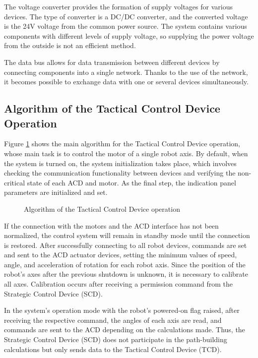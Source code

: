 The voltage converter provides the formation of supply voltages for various devices. The type of converter is a DC/DC converter, and the converted voltage is the 24V voltage from the common power source. The system contains various components with different levels of supply voltage, so supplying the power voltage from the outside is not an efficient method.

The data bus allows for data transmission between different devices by connecting components into a single network. Thanks to the use of the network, it becomes possible to exchange data with one or several devices simultaneously.
\subsection{Algorithm of the Tactical Control Device Operation}

Figure \ref{AlgTCD} shows the main algorithm for the Tactical Control Device operation, whose main task is to control the motor of a single robot axis. By default, when the system is turned on, the system initialization takes place, which involves checking the communication functionality between devices and verifying the non-critical state of each ACD and motor. As the final step, the indication panel parameters are initialized and set.


\begin{figure}[H]
	\centering
	
	\caption{Algorithm of the Tactical Control Device operation}
	\label{AlgTCD}
\end{figure}


If the connection with the motors and the ACD interface has not been normalized, the control system will remain in standby mode until the connection is restored. After successfully connecting to all robot devices, commands are set and sent to the ACD actuator devices, setting the minimum values of speed, angle, and acceleration of rotation for each robot axis. Since the position of the robot's axes after the previous shutdown is unknown, it is necessary to calibrate all axes. Calibration occurs after receiving a permission command from the Strategic Control Device (SCD).

In the system's operation mode with the robot's powered-on flag raised, after receiving the respective command, the angles of each axis are read, and commands are sent to the ACD depending on the calculations made. Thus, the Strategic Control Device (SCD) does not participate in the path-building calculations but only sends data to the Tactical Control Device (TCD).

